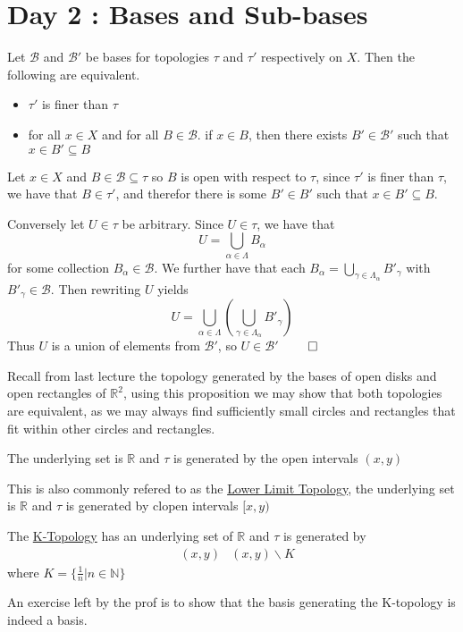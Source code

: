 \section{Day 2 : Bases and Sub-bases}
\begin{proposition}
    Let $\mathscr{B}$ and $\mathscr{B}'$ be bases for topologies $\tau$ and $\tau'$ respectively on $X$. Then the following are equivalent.
    \begin{itemize}
        \item $\tau'$ is finer than $\tau$
        \item for all $x\in X$ and for all $B\in\mathscr{B}$. if $x\in B$, then there exists $B'\in\mathscr{B}'$ such that $x\in B'\subseteq B$
    \end{itemize}
\end{proposition}
Let $x\in X$ and $B\in\mathscr{B}\subseteq\tau$ so $B$ is open with respect to $\tau$, since $\tau'$ is finer than $\tau$, we have that $B\in\tau'$, and therefor there is some $B'\in B'$ such that $x\in B'\subseteq B$. 

Conversely let $U\in\tau$ be arbitrary. Since $U\in\tau$, we have that 
\[U=\bigcup_{\alpha\in\Lambda}B_\alpha\]
for some collection $B_\alpha\in\mathscr{B}$. We further have that each $B_\alpha=\bigcup_{\gamma\in\Lambda_\alpha}B'_\gamma$ with $B'_\gamma\in\mathscr{B}$. Then rewriting $U$ yields
\[U=\bigcup_{\alpha\in\Lambda}\left(\bigcup_{\gamma\in\Lambda_\alpha}B'_\gamma\right)\]
Thus $U$ is a union of elements from $\mathscr{B}'$, so $U\in\mathscr{B}'$ $\qed$

Recall from last lecture the topology generated by the bases of open disks and open rectangles of $\mathbb{R}^2$, using this proposition we may show that both topologies are equivalent, as we may always find sufficiently small circles and rectangles that fit within other circles and rectangles.

\begin{example}
    The underlying set is $\mathbb{R}$ and $\tau$ is generated by the open intervals $(x,y)$
\end{example}
\begin{example}
    This is also commonly refered to as the \href{https://en.wikipedia.org/wiki/Lower_limit_topology}{Lower Limit Topology}, the underlying set is $\mathbb{R}$ and $\tau$ is generated by clopen intervals $[x,y)$
\end{example}
\begin{example}[K-Topology]
    The \href{https://en.wikipedia.org/wiki/K-topology}{K-Topology} has an underlying set of $\mathbb{R}$ and $\tau$ is generated by
    \begin{align*}
        &(x,y) &(x,y)\backslash K
    \end{align*}
    where $K=\{\frac{1}{n}\vert n\in\mathbb{N}\}$
\end{example}
An exercise left by the prof is to show that the basis generating the K-topology is indeed a basis.

